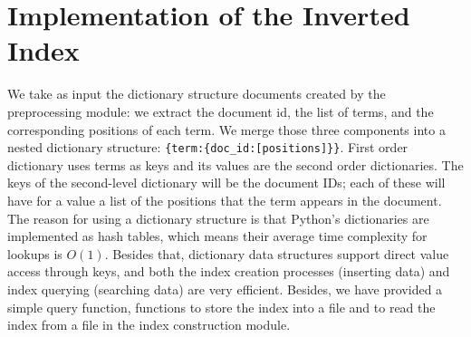 \section{Implementation of the Inverted Index}

We take as input the dictionary structure documents created by the preprocessing module: we extract the document id, the list of terms, and the corresponding positions of each term.
We merge those three components into a nested dictionary structure: \texttt{\{term:\{doc\_id:[positions]\}\}}.
First order dictionary uses terms as keys and its values are the second order dictionaries. The keys of the second-level dictionary will be the document IDs; each of these will have for a value a list of the positions that the term appears in the document. The reason for using a dictionary structure is that Python's dictionaries are implemented as hash tables, which means their average time complexity for lookups is $O(1)$. Besides that, dictionary data structures support direct value access through keys, and both the index creation processes (inserting data) and index querying (searching data) are very efficient. Besides, we have provided a simple query function, functions to store the index into a file and to read the index from a file in the index construction module. 